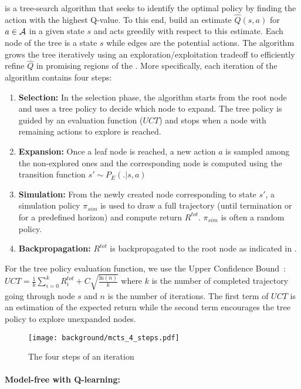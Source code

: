 \mcts is a tree-search algorithm that seeks to identify the optimal policy by finding the action with the highest Q-value. To this end, \mcts build an estimate $\hat{Q}(s,a)$ for $a \in \mathcal{A}$ in a given state $s$ and acts greedily with respect to this estimate. Each node of the tree is a state $s$ while edges are the potential actions. The \mcts algorithm grows the tree iteratively using an exploration/exploitation tradeoff to efficiently refine $\hat{Q}$ in promising regions of the \mdp. More specifically, each iteration of the \mcts algorithm contains four steps:
\begin{enumerate}[noitemsep]
	\item \textbf{Selection:} In the selection phase, the \mcts algorithm starts from the root node and uses a tree policy to decide which node to expand. The tree policy is guided by an evaluation function ($UCT$) and stops when a node with remaining actions to explore is reached. 
	\item \textbf{Expansion:} Once a leaf node is reached, a new action $a$ is sampled among the non-explored ones and the corresponding node is computed using the transition function $s' \sim P_E(.|s,a)$
	\item \textbf{Simulation:} From the newly created node corresponding to state $s'$, a simulation policy $\pi_{sim}$ is used to draw a full trajectory (until termination or for a predefined horizon) and compute return $R^{tot}$. $\pi_{sim}$ is often a random policy.
	\item \textbf{Backpropagation:} $R^{tot}$ is backpropagated to the root node as indicated in .
\end{enumerate}
For the tree policy evaluation function, we use the Upper Confidence Bound~\citep{auer_finite-time_2002}: $UCT = \frac{1}{k}\sum_{i=0}^{k} R^{tot}_{i} + C\sqrt{\frac{\text{ln}(n)}{k}}$ where $k$ is the number of completed trajectory going through node $s$ and $n$ is the number of iterations. The first term of $UCT$ is an estimation of the expected return while the second term encourages the tree policy to explore unexpanded nodes.
\begin{figure}[!h]
\centering
\texttt{[image: background/mcts\_4\_steps.pdf]}
\caption{The four steps of an \mcts iteration}
\label{fig:mcts_steps}	
\end{figure}

\paragraph{Model-free \rl with Q-learning:}


